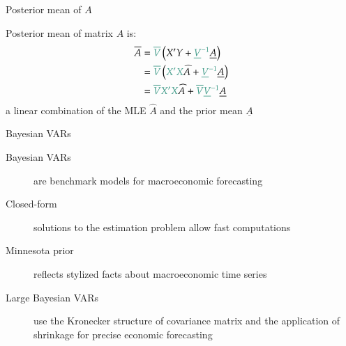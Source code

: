 \documentclass[notes,blackandwhite,mathsans,usenames,dvipsnames]{beamer}
\begin{document}
\begin{frame}{Posterior mean of $A$}

{\color{mcxs2}Posterior mean of matrix} $A$ {\color{mcxs2}is:}
\begin{align*}
\overline{A} &= {\color{mcxs2}\overline{V}}\left( X'Y + {\color{mcxs2}\underline{V}^{-1}}\underline{A} \right)\\ 
&= {\color{mcxs2}\overline{V}}\left( {\color{mcxs2}X'X}\widehat{A} + {\color{mcxs2}\underline{V}^{-1}}\underline{A} \right)\\ 
&= {\color{mcxs2}\overline{V} X'X}\widehat{A} + {\color{mcxs2}\overline{V}\underline{V}^{-1}}\underline{A} 
\end{align*}
{\color{mcxs2}a linear combination of the MLE} $\widehat{A}$ {\color{mcxs2}and the prior mean} $\underline{A}$

\end{frame}


{
\begin{frame}{\color{mcxs1}Bayesian VARs}
\begin{description}
\item[Bayesian VARs] {\color{mcxs5}are benchmark models for macroeconomic forecasting}

\smallskip\item[Closed-form] {\color{mcxs5}solutions to the estimation problem allow fast computations}

\smallskip\item[Minnesota prior] {\color{mcxs5}reflects stylized facts about macroeconomic time series}

\smallskip\item[Large Bayesian VARs] {\color{mcxs5}use the Kronecker structure of covariance matrix and the application of shrinkage for precise economic forecasting}
\end{description}
\end{frame}
}
\end{document}
